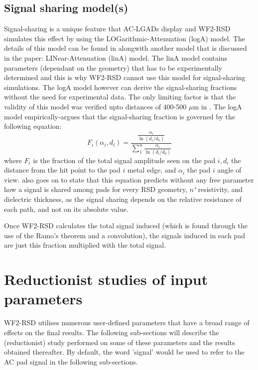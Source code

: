 \documentclass[11pt]{article}
\begin{document}
\subsection{Signal sharing model(s)}
Signal-sharing is a unique feature that AC-LGADs display and WF2-RSD simulates this effect by using the LOGarithmic-Attenuation (logA) model. The details of this model can be found in \cite{Tornago2021} alongwith another model that is discussed in the paper: LINear-Attenuation (linA) model. The linA model contains parameters (dependant on the geometry) that has to be experimentally determined and this is why WF2-RSD cannot use this model for signal-sharing simulations. The logA model however can derive the signal-sharing fractions without the need for experimental data. The only limiting factor is that the validity of this model was verified upto distances of 400-500 $\mu$m in \cite{Tornago2021}. The logA model empirically-argues that the signal-sharing fraction is governed by the following equation:
\begin{equation}
F_i\left(\alpha_i, d_i\right)=\frac{\frac{\alpha_i}{\ln \left(d_i / d_0\right)}}{\sum_1^n \frac{\alpha_i}{\ln \left(d_i / d_0\right)}}
\end{equation}
where $F_i$ is the fraction of the total signal amplitude seen on the pad $i, d_i$ the distance from the hit point to the pad $i$ metal edge, and $\alpha_i$ the pad $i$ angle of view. \cite{Tornago2021} also goes on to state that this equation predicts without any free parameter how a signal is shared among pads for every RSD geometry, $n^{+}$resistivity, and dielectric thickness, as the signal sharing depends on the relative resistance of each path, and not on its absolute value.

Once WF2-RSD calculates the total signal induced (which is found through the use of the Ramo's theorem and a convolution), the signals induced in each pad are just this fraction multiplied with the total signal.

\section{Reductionist studies of input parameters}\label{sec:full_analysis}
WF2-RSD utilises numerous user-defined parameters that have a broad range of effects on the final results. The following sub-sections will describe the (reductionist) study performed on some of these parameters and the results obtained thereafter. By default, the word 'signal' would be used to refer to the AC pad signal in the following sub-sections.
\end{document}
